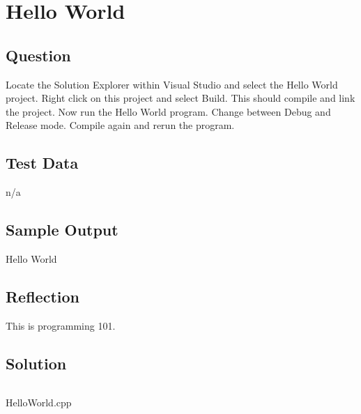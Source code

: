 \documentclass[main.tex]{subfiles}
\begin{document}
    \section{Hello World}
        \subsection{Question}
            Locate the Solution Explorer within Visual Studio and select the Hello World project. Right click on this project and select Build. This should compile and link the project. Now run the Hello World program.
            Change between Debug and Release mode. Compile again and rerun the program.

        \subsection{Test Data}
            n/a

        \subsection{Sample Output}
            Hello World

        \subsection{Reflection}
            This is programming 101.
        
        \subsection{Solution}
            \begin{listing}[H]
                \inputminted{cpp}{../Tasks/01-HelloWorld/HelloWorld.cpp}
                \caption{HelloWorld.cpp}
            \end{listing}
\end{document}
